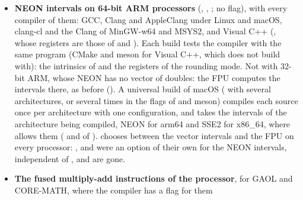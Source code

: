 \documentclass[12pt,a4paper,twoside,openright]{book}
\begin{document}
\begin{itemize}
  with , so that they ask for aligned memory for the
  intervals and for what holds one, and  and 
  give the flag to the code using GAOL too, as it allocates them;
   refuses the SSE2 intervals compiled without it.
  Visual C++ and clang-cl have no such flag ( does
  nothing in C++14 with , and breaks the STL of clang-cl, and only
  C++17 turns the aligned  on): their SSE2 intervals keep their two
  bounds as two doubles, whose alignment is 8, and load and store them with
   ( of
  , which derives it from the target), so that they
  need no aligned memory, and the class allocators that aligned the intervals
  on 16 bytes are not compiled.\newinvfive
{}%
\item[$\bullet$] \textbf{NEON intervals on 64-bit ARM processors}
  (, , ; no
  flag), with every compiler of them: GCC, Clang and AppleClang under Linux
  and macOS, clang-cl and the Clang of MinGW-w64 and MSYS2, and Visual C++
  (, whose registers are those of  and
  ). Each build tests the compiler with the same
  program (CMake and meson for Visual C++, which  does not
  build with): the intrinsics of  and the registers of
  the rounding mode. Not with 32-bit ARM, whose NEON has no vector of
  doubles: the FPU computes the intervals there, as before
  (). A universal build of macOS
  ( with several architectures, or
   several times in the flags of  and meson)
  compiles each source once per architecture with one configuration, and
  takes the intervals of the architecture being compiled, NEON for arm64 and
  SSE2 for x86\_64, where  allows them
  ( and  of
  ).  chooses between the
  vector intervals and the FPU on every processor: ,
   and  were an option of their
  own for the NEON intervals, independent of , and are
  gone.\newinvfive
{}%
%
\item[$\bullet$] \textbf{The fused multiply-add instructions of the
  processor}, for GAOL and CORE-MATH, where the compiler has a flag for them

\end{itemize}
\end{document}
